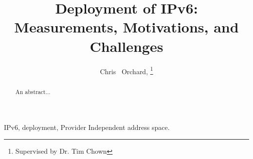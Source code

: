 \documentclass[final, technote, a4paper]{IEEEtran}
\begin{document}
\title{Deployment of IPv6: Measurements, Motivations, and Challenges}

\author{Chris ~Orchard, \thanks{Supervised by Dr. Tim Chown}}


\maketitle

\begin{abstract}
An abstract...
\end{abstract}

\begin{IEEEkeywords}
IPv6, deployment, Provider Independent address space.
\end{IEEEkeywords}

\end{document}
